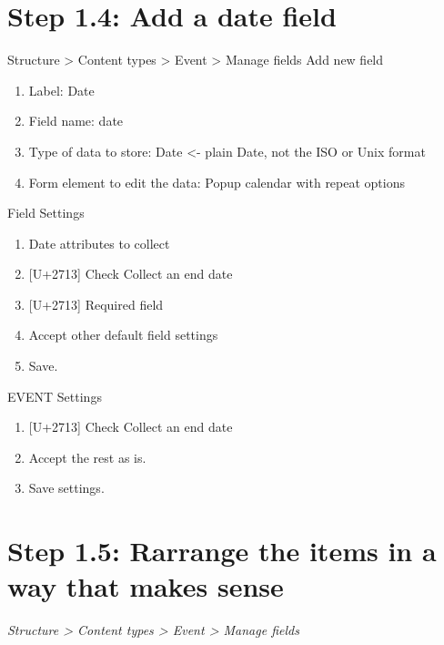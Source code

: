 \documentclass[letterpaper,10pt,english]{sphinxmanual}
\begin{document}
\section{Step 1.4: Add a date field}
\label{event_calendar:step-1-4-add-a-date-field}
Structure \textgreater{} Content types \textgreater{} Event \textgreater{} Manage fields
Add new field
\begin{enumerate}
\item {} 
Label: Date

\item {} 
Field name: date

\item {} 
Type of data to store: Date \textless{}- plain Date, not the ISO or Unix format

\item {} 
Form element to edit the data: Popup calendar with repeat options

\end{enumerate}

Field Settings
\begin{enumerate}
\item {} 
Date attributes to collect

\item {} 
{[}U+2713{]} Check Collect an end date

\item {} 
{[}U+2713{]} Required field

\item {} 
Accept other default field settings

\item {} 
Save.

\end{enumerate}

EVENT Settings
\begin{enumerate}
\item {} 
{[}U+2713{]} Check Collect an end date

\item {} 
Accept the rest as is.

\item {} 
Save settings.

\end{enumerate}


\section{Step 1.5: Rarrange the items in a way that makes sense}
\label{event_calendar:step-1-5-rarrange-the-items-in-a-way-that-makes-sense}
\emph{Structure \textgreater{} Content types \textgreater{} Event \textgreater{} Manage fields}
\end{document}
